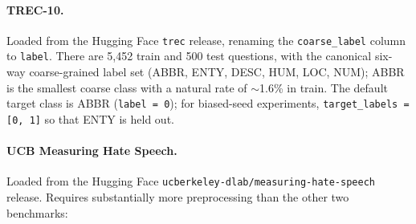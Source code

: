 \documentclass[11pt]{article}
\begin{document}
\paragraph{TREC-10.} Loaded from the Hugging Face \texttt{trec} release, renaming the \texttt{coarse\_label} column to \texttt{label}. There are 5{,}452 train and 500 test questions, with the canonical six-way coarse-grained label set (ABBR, ENTY, DESC, HUM, LOC, NUM); ABBR is the smallest coarse class with a natural rate of $\sim$1.6\% in train. The default target class is ABBR (\texttt{label = 0}); for biased-seed experiments, \texttt{target\_labels = [0, 1]} so that ENTY is held out.

\paragraph{UCB Measuring Hate Speech.} Loaded from the Hugging Face \texttt{ucberkeley-dlab/measuring-hate-speech} release. Requires substantially more preprocessing than the other two benchmarks:
\end{document}
